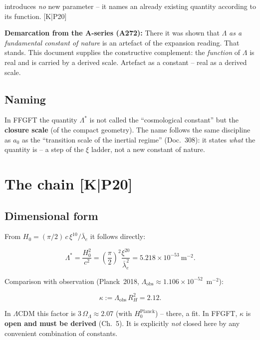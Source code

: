 \documentclass[11pt]{report}
\begin{document}
introduces \emph{no} new parameter -- it names an already existing
quantity according to its function. [K|P20]

\textbf{Demarcation from the A-series (A272):} There it was shown
that $\Lambda$ \emph{as a fundamental constant of nature} is an
artefact of the expansion reading. That stands. This document
supplies the constructive complement: the \emph{function} of
$\Lambda$ is real and is carried by a derived scale. Artefact as a
constant -- real as a derived scale.

\section{Naming}

In FFGFT the quantity $\Lambda^{*}$ is not called the
\enquote{cosmological constant} but the \textbf{closure scale} (of
the compact geometry). The name follows the same discipline as
$a_0$ as the \enquote{transition scale of the inertial regime}
(Doc.~308): it states \emph{what} the quantity is -- a step of the
$\xi$ ladder, not a new constant of nature.

\chapter{The chain [K|P20]}

\section{Dimensional form}

From $H_0 = (\pi/2)\,c\,\xi^{10}/\bar\lambda_e$ it follows directly:

\begin{equation}
  \Lambda^{*}
  = \frac{H_0^2}{c^2}
  = \left(\frac{\pi}{2}\right)^{2}\frac{\xi^{20}}{\bar\lambda_e^{2}}
  = 5.218\times10^{-53}~\text{m}^{-2}.
  \label{eq:chain}
\end{equation}

Comparison with observation (Planck~2018,
$\Lambda_\text{obs} \approx 1.106\times10^{-52}$~m$^{-2}$):

\begin{equation}
  \kappa := \Lambda_\text{obs}\,R_H^{2} = 2.12.
  \label{eq:kappa}
\end{equation}

In $\Lambda$CDM this factor is $3\,\Omega_\Lambda \approx 2.07$
(with $H_0^\text{Planck}$) -- there, a fit. In FFGFT, $\kappa$ is
\textbf{open and must be derived} (Ch.~5). It is explicitly
\emph{not} closed here by any convenient combination of constants.
\end{document}
